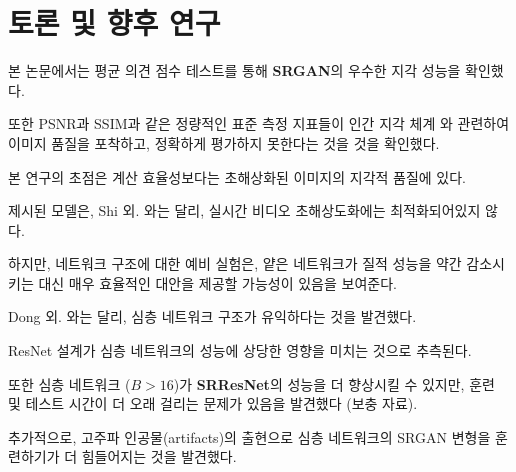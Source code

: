 \documentclass[10pt,twocolumn,letterpaper]{article}
\newcommand{\kor}[1]{#1}
\newcommand{\eng}[1]{}
\begin{document}
\section{\eng{Discussion and future work}\kor{토론 및 향후 연구}}
\label{sec:discussion}
\eng{
We confirmed the superior perceptual performance of \textbf{SRGAN} using \ac{MOS} testing.
}\kor{
본 논문에서는 \ac{평균 의견 점수} 테스트를 통해 \textbf{SRGAN}의 우수한 지각 성능을 확인했다.
} \eng{
We have further shown that standard quantitative measures such as PSNR and SSIM fail to capture and accurately assess image quality with respect to the human visual system \cite{Toderici2016}.
}\kor{
또한 PSNR과 SSIM과 같은 정량적인 표준 측정 지표들이 인간 지각 체계 \cite{Toderici2016}와 관련하여 이미지 품질을 포착하고, 정확하게 평가하지 못한다는 것을 것을 확인했다.
}
\eng{
The focus of this work was the perceptual quality of super-resolved images rather than computational efficiency.
}\kor{
본 연구의 초점은 계산 효율성보다는 초해상화된 이미지의 지각적 품질에 있다.
} \eng{
The presented model is, in contrast to Shi et al. \cite{Shi2016ESPCN}, not optimized for video \ac{SR} in real-time.
}\kor{
제시된 모델은, Shi 외. \cite{Shi2016ESPCN}와는 달리, 실시간 비디오 초해상도화에는 최적화되어있지 않다.
}\eng{
However, preliminary experiments on the network architecture suggest that shallower networks have the potential to provide very efficient alternatives at a small reduction of qualitative performance.
}\kor{
하지만, 네트워크 구조에 대한 예비 실험은, 얕은 네트워크가 질적 성능을 약간 감소시키는 대신 매우 효율적인 대안을 제공할 가능성이 있음을 보여준다.
} %
\eng{
In contrast to Dong et al. \cite{dong2016image}, we found deeper network architectures to be beneficial.
}\kor{
Dong 외. \cite{dong2016image}와는 달리, 심층 네트워크 구조가 유익하다는 것을 발견했다.
} \eng{
We speculate that the \ac{ResNet} design has a substantial impact on the performance of deeper networks.
}\kor{
\ac{ResNet} 설계가 심층 네트워크의 성능에 상당한 영향을 미치는 것으로 추측된다.
} \eng{
We found that even deeper networks ($B>16$) can further increase the performance of \textbf{SRResNet}, however, come at the cost of longer training and testing times (\cf supplementary material).
}\kor{
또한 심층 네트워크 ($B>16$)가 \textbf{SRResNet}의 성능을 더 향상시킬 수 있지만, 훈련 및 테스트 시간이 더 오래 걸리는 문제가 있음을 발견했다 (\cf 보충 자료).
} \eng{
We further found \ac{SRGAN} variants of deeper networks are increasingly difficult to train due to the appearance of high-frequency artifacts.
}\kor{
추가적으로, 고주파 인공물(artifacts)의 출현으로 심층 네트워크의 \ac{SRGAN} 변형을 훈련하기가 더 힘들어지는 것을 발견했다.
}
\end{document}
